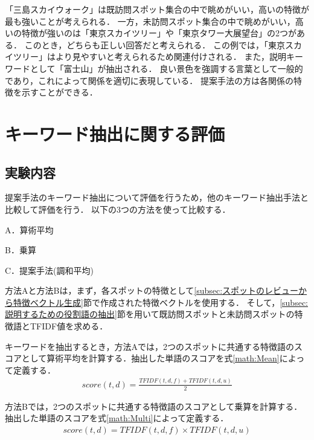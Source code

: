 \documentclass{deimj}
\begin{document}
「三島スカイウォーク」は既訪問スポット集合の中で眺めがいい，高いの特徴が最も強いことが考えられる．
一方，未訪問スポット集合の中で眺めがいい，高いの特徴が強いのは「東京スカイツリー」や「東京タワー大展望台」の2つがある．
このとき，どちらも正しい回答だと考えられる．
この例では，「東京スカイツリー」はより見やすいと考えられるため関連付けされる．
また，説明キーワードとして「富士山」が抽出される．
良い景色を強調する言葉として一般的であり，これによって関係を適切に表現している．
提案手法の方は各関係の特徴を示すことができる．


\section{キーワード抽出に関する評価}
\label{sec:キーワード抽出評価}
\subsection{実験内容}
提案手法のキーワード抽出について評価を行うため，他のキーワード抽出手法と比較して評価を行う．
以下の3つの方法を使って比較する．
\begin{description}
  \item A．算術平均
  \item B．乗算
  \item C．提案手法(調和平均)
\end{description}

方法Aと方法Bは，まず，各スポットの特徴として\ref{subsec:スポットのレビューから特徴ベクトル生成}節で作成された特徴ベクトルを使用する．
そして，\ref{subsec:説明するための役割語の抽出}節を用いて既訪問スポットと未訪問スポットの特徴語とTFIDF値を求める．

キーワードを抽出するとき，方法Aでは，2つのスポットに共通する特徴語のスコアとして算術平均を計算する．抽出した単語のスコアを式\ref{math:Mean}によって定義する．
\begin{eqnarray}
  score(t,d) = \frac{TFIDF(t,d,f) + TFIDF(t,d,u)}{2}
  \label{math:Mean}
\end{eqnarray}

方法Bでは，2つのスポットに共通する特徴語のスコアとして乗算を計算する．抽出した単語のスコアを式\ref{math:Multi}によって定義する．
\begin{eqnarray}
  score(t,d) = TFIDF(t,d,f) \times TFIDF(t,d,u)
  \label{math:Multi}
\end{eqnarray}
\end{document}
